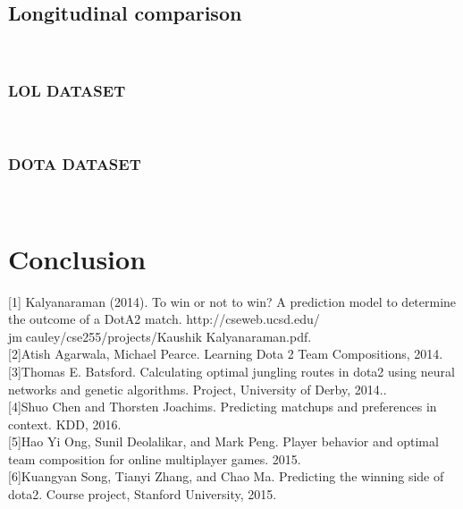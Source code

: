 \documentclass[a4paper,fleqn]{cas-sc}
\begin{document}
\subsection{ Longitudinal comparison}
\\
\subsubsection{LOL DATASET}
\\
\subsubsection{DOTA DATASET}
\\

\section{Conclusion}


\par
\printcredits

% 






\bio{}
[1] Kalyanaraman (2014). To win or not to win? A prediction model to determine the outcome of a DotA2 match. http://cseweb.ucsd.edu/ jmcauley/cse255/projects/Kaushik Kalyanaraman.pdf.\\
\bio{}
[2]Atish Agarwala, Michael Pearce. Learning Dota 2 Team Compositions, 2014.\\
\bio{}
[3]Thomas E. Batsford. Calculating optimal jungling routes in dota2 using neural networks and genetic algorithms. Project, University of Derby, 2014..\\
\bio{}
[4]Shuo Chen and Thorsten Joachims. Predicting matchups and preferences in context. KDD, 2016.\\
\bio{}
[5]Hao Yi Ong, Sunil Deolalikar, and Mark Peng. Player behavior and optimal team composition for online multiplayer games. 2015.\\
\bio{}
[6]Kuangyan Song, Tianyi Zhang, and Chao Ma. Predicting the winning side of dota2. Course project, Stanford University, 2015.\\

\endbio
\end{document}

